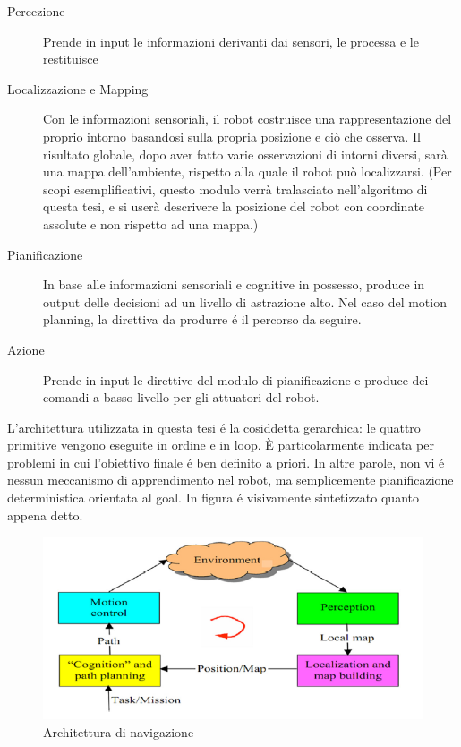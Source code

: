 \documentclass[14pt,twoside,a4paper]{extarticle}
\begin{document}
\begin{description}
\item[Percezione] Prende in input le informazioni derivanti dai sensori, le processa e le restituisce
\item[Localizzazione e Mapping] Con le informazioni sensoriali, il robot costruisce una rappresentazione del proprio intorno basandosi sulla propria posizione e ciò che osserva. Il risultato globale, dopo aver fatto varie osservazioni di intorni diversi, sarà una mappa dell'ambiente, rispetto alla quale il robot può localizzarsi. (Per scopi esemplificativi, questo modulo verrà tralasciato nell'algoritmo di questa tesi, e si userà descrivere la posizione del robot con coordinate assolute e non rispetto ad una mappa.)
\item[Pianificazione] In base alle informazioni sensoriali e cognitive in possesso, produce in output delle decisioni ad un livello di astrazione alto. Nel caso del motion planning, la direttiva da produrre é il percorso da seguire.
\item[Azione] Prende in input le direttive del modulo di pianificazione e produce dei comandi a basso livello per gli attuatori del robot.
\end{description}
L'architettura utilizzata in questa tesi é la cosiddetta gerarchica: le quattro primitive vengono eseguite in ordine e in loop. È particolarmente indicata per problemi in cui l'obiettivo finale é ben definito a priori. In altre parole, non vi é nessun meccanismo di apprendimento nel robot, ma semplicemente pianificazione deterministica orientata al goal. In figura é visivamente sintetizzato quanto appena detto.

\begin{figure}[H]
\caption{Architettura di navigazione\cite{mac2016}}
\centering
\includegraphics[scale=0.6]{architetturaNavigazione.png}
\end{figure}
\end{document}
